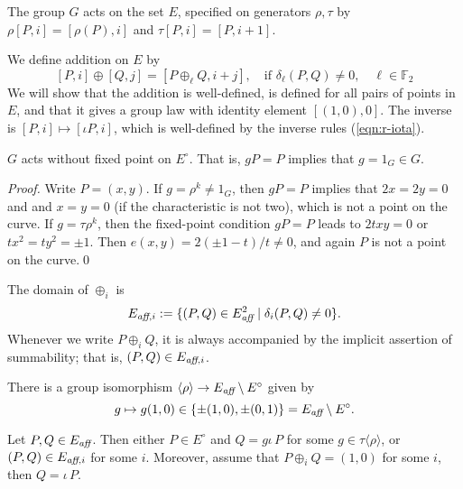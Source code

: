 \documentclass{llncs}
\newcommand{\ring}[1]{\mathbb{#1}}
\newcommand{\op}[1]{\hbox{#1}}
\newcommand{\Eaff}{E_{\op{\scriptsize\it aff}}}
\newcommand{\Eaf}[1]{E_{\op{\scriptsize\it aff},{#1}}}
\newcommand{\Eoo}{E^{\circ}} %
\newcommand{\ang}[1]{\langle{#1}\rangle}
\begin{document}
The group $G$ acts on the set $E$, specified on generators $\rho,\tau$
by $\rho[P,i]=[\rho(P),i]$ and $\tau[P,i]=[P,i+1]$.

We define addition on $E$ by
\begin{equation}\label{eqn:add-proj}
[P,i]\oplus [Q,j] = [P\oplus_\ell Q,i+j],\quad 
\text{if } \delta_\ell(P,Q)\ne 0,\quad \ell\in\ring{F}_2
\end{equation}
We will show that the addition is well-defined, is defined for all
pairs of points in $E$, and that it gives a group law with identity
element $[(1,0),0]$.  The inverse is $[P,i]\mapsto [\iota P,i]$, which
is well-defined by the inverse rules (\ref{eqn:r-iota}).


\begin{lemma} \label{lemma:no-fix} $G$ acts without fixed point on
  $\Eoo$.  That is, $g P = P$ implies that $g=1_G\in G$.
\end{lemma}

\begin{proof} Write $P=(x,y)$.  If $g = \rho^k\ne 1_G$, then $g P = P$
  implies that $2x=2y=0$ and and $x=y=0$ (if the characteristic is not
  two), which is not a point on the curve.  If $g = \tau \rho^k$, then
  the fixed-point condition $g P = P$ leads to $2t x y=0$ or $t x^2 =
  t y^2 =\pm 1$.  Then $e(x,y) = 2 (\pm1-t)/t\ne0$, and again $P$ is
  not a point on the curve.\qed
\end{proof}

The domain of $\oplus_i$ is
\[
\Eaf{i} := \{(P,Q)\in \Eaff^2\mid \delta_i(P,Q)\ne0\}.
\]
Whenever we write $P\oplus_i Q$, it is always accompanied by the
implicit assertion of summability; that is, $(P,Q)\in \Eaf{i}$.

There is a group isomorphism $\ang{\rho}\to \Eaff\setminus\Eoo$ given by
\[
g\mapsto g(1,0)\in\{\pm (1,0),\pm (0,1)\} = \Eaff\setminus \Eoo.
\]

\begin{lemma}[dichotomy]\label{lemma:noco} 
Let $P,Q\in \Eaff$.  Then either $P\in \Eoo$ and $Q=g \iota\, P$ for
some $g\in \tau\ang{\rho}$, or $(P,Q)\in \Eaf{i}$ for some $i$.
Moreover, assume that $P\oplus_i Q = (1,0)$ for some $i$, then $Q =
\iota\,P$.
\end{lemma}
\end{document}
